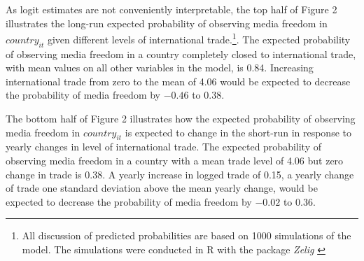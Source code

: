 \documentclass[12pt,a4paper]{article}\usepackage[]{graphicx}\usepackage[]{color}
\begin{document}
As logit estimates are not conveniently interpretable, the top half of Figure 2 illustrates the long-run expected probability of observing media freedom in $country_{it}$ given different levels of international trade.\footnote{All discussion of predicted probabilities are based on 1000 simulations of the model. The simulations were conducted in R with the package \emph{Zelig} \parencite*{ZeligEveryonesSt:2009ts}}. The expected probability of observing media freedom in a country completely closed to international trade, with mean values on all other variables in the model, is 0.84. Increasing international trade from zero to the mean of 4.06 would be expected to decrease the probability of media freedom by \ensuremath{-0.46} to 0.38.

The bottom half of Figure 2 illustrates how the expected probability of observing media freedom in $country_{it}$ is expected to change in the short-run in response to yearly changes in level of international trade. The expected probability of observing media freedom in a country with a mean trade level of 4.06 but zero change in trade is 0.38. A yearly increase in logged trade of 0.15, a yearly change of trade one standard deviation above the mean yearly change, would be expected to decrease the probability of media freedom by \ensuremath{-0.02} to 0.36.
\end{document}
